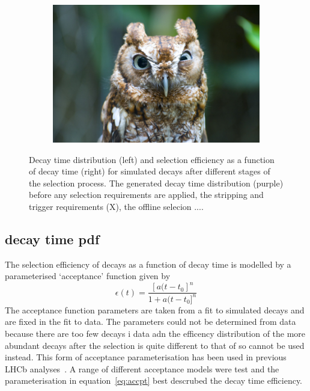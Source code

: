 \begin{figure}[htbp]
\begin{subfigure}[b]{0.48\textwidth}
       \includegraphics[width=\textwidth]{./Figs/placeholder.jpeg}
   \end{subfigure}
    \caption{Decay time distribution (left) and selection efficiency as a function of decay time (right) for \bsmumu simulated decays after different stages of the selection process. The generated decay time distribution (purple) before any selection requirements are applied, the stripping and trigger requirements (X), the offline selecion ....}
    \label{fig:accpteg}
\end{figure}

\subsection{\bsmumu decay time pdf}
\label{sec:signalDTpdf}
The selection efficiency of \bsmumu decays as a function of decay time is modelled by a parameterised `acceptance' function given by
\begin{equation}
\epsilon(t) = \frac{[a(t - t_{0}]^{n}}{1 + a(t - t_{0}]^{n}}
\label{eq:accpt}
\end{equation}
The acceptance function parameters are taken from a fit to simulated \bsmumu decays and are fixed in the fit to data. The parameters could not be determined from data because there are too few \bsmumu decays i data adn the efficency distribution of the more abundant \bhh decays after the selection is quite different to that of \bsmumu so cannot be used instead. This form of acceptance parameterisation has been used in previous LHCb analyses~\cite{}. A range of different acceptance models were test and the parameterisation in equation~\ref{eq:accpt} best descrubed the decay time efficiency.


